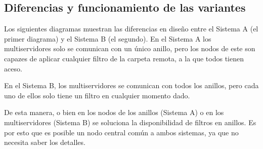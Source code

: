 \documentclass{article}
\begin{document}
\begin{flushleft}
		\clearpage
		\subsection{Diferencias y funcionamiento de las variantes}
		Los siguientes diagramas muestran las diferencias en diseño entre el Sistema A (el primer diagrama) y el Sistema B (el segundo). En el Sistema A los multiservidores solo se comunican con un único anillo, pero los nodos de este son capazes de aplicar cualquier filtro de la carpeta remota, a la que todos tienen aceso. 
		\linebreak
		
		\hspace*{-0.5cm}
		\bigskip

		En el Sistema B, los multiservidores se comunican con todos los anillos, pero cada uno de ellos solo tiene un filtro en cualquier momento dado.
		
		\hspace*{-0.5cm}
		\bigskip
		
		De esta manera, o bien en los nodos de los anillos (Sistema A) o en los multiservidores (Sistema B) se soluciona la disponibilidad de filtros en anillos. Es por esto que es posible un nodo central común a ambos sistemas, ya que no necesita saber los detalles.
			

\end{flushleft}
\end{document}
